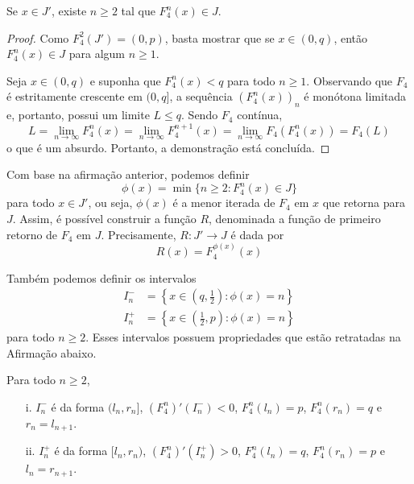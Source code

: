 \begin{affirmation}
Se $x \in J'$, existe $n \geq 2$ tal que $F_4^n(x) \in J$.
\end{affirmation}

\begin{proof}
Como $F_4^2(J') = (0, p)$, basta mostrar que se $x \in (0, q)$, então $F_4^n(x) \in J$ para algum $n \geq 1$.

Seja $x \in (0,q)$ e suponha que $F_4^n(x) < q$ para todo $n \geq 1$. Observando que $F_4$ é estritamente crescente em $(0,q]$, a sequência $(F_4^n(x))_n$ é monótona limitada e, portanto, possui um limite $L \leq q$. Sendo $F_4$ contínua,
$$L = \lim_{n \to \infty} F_4^n(x) = \lim_{n \to \infty} F_4^{n+1}(x) = \lim_{n \to \infty} F_4(F_4^n(x)) = F_4(L)$$
o que é um absurdo. Portanto, a demonstração está concluída.
\end{proof}

Com base na afirmação anterior, podemos definir
$$\phi(x) = \min \{ n \geq 2 : F_4^n(x) \in J \}$$
para todo $x \in J'$, ou seja, $\phi(x)$ é a menor iterada de $F_4$ em $x$ que retorna para $J$.  Assim, é possível construir a função $R$, denominada a função de primeiro retorno de $F_4$ em $J$. Precisamente, $R: J' \to J$ é dada por
$$R(x) = F_4^{\phi(x)}(x)$$

Também podemos definir os intervalos
\begin{align*}
I^-_n & = \left \{ x \in \left ( q, \frac{1}{2} \right ) : \phi(x) = n \right \}\\
I^+_n & = \left \{ x \in \left ( \frac{1}{2}, p \right ) : \phi(x) = n \right \}
\end{align*}
para todo $n \geq 2$. Esses intervalos possuem propriedades que estão retratadas na Afirmação abaixo.

\begin{affirmation}
Para todo $n \geq 2$,
\begin{enumerate}
\item[i.] $I^-_n$ é da forma $(l_n, r_n]$, $(F_4^n)'(I^-_n) < 0$, $F_4^n(l_n) = p$, $F_4^n(r_n) = q$ e $r_n = l_{n+1}$.
\item[ii.] $I^+_n$ é da forma $[l_n, r_n)$, $(F_4^n)'(I^+_n) > 0$, $F_4^n(l_n) = q$, $F_4^n(r_n) = p$ e $l_n = r_{n+1}$.
\end{enumerate}
\end{affirmation}

